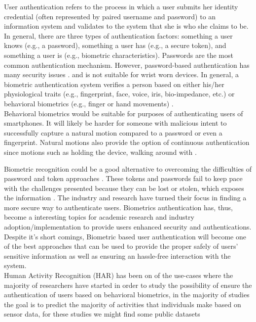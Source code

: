 \documentclass[10pt,halfline,a4paper]{ouparticle}
\begin{document}
\noindent
User authentication refers to the process in which a user submits her identity credential (often represented by paired username and password) to an information system and validates to the system that she is who she claims to be. In general, there are three types of authentication factors: something a user knows (e.g., a password), something a user has (e.g., a secure token), and something a user is (e.g., biometric characteristics). Passwords are the most common authentication mechanism. However, password-based authentication has many security issues \cite{Klein} \cite{Own} \cite{Ratha}. and is not suitable for wrist worn devices. In general, a biometric authentication system verifies a person based on either his/her physiological traits (e.g., fingerprint, face, voice, iris, bio-impedance, etc.) \cite{Own} \cite{Anzaku} \cite{Cornelius} or behavioral biometrics (e.g., finger or hand movements) \cite{Zheng} \cite{Luca}.\\

\noindent
Behavioral biometrics would be suitable for purposes of authenticating users of smartphones. It will likely be harder for someone with malicious intent to successfully capture a natural motion compared to a password or even a fingerprint. Natural motions also provide the option of continuous authentication since motions such as holding the device, walking around with \cite{Maghsoudi}.

\noindent 
Biometric recognition could be a good alternative to overcoming the difficulties of password and token approaches \cite{Alariki}\cite{Crawford}. These tokens and passwords fail to keep pace with the challenges presented because they can be lost or stolen, which exposes the information \cite{Alariki}. The industry and research have turned their focus in finding a more secure way to authenticate users. Biometrics authentication has, thus, become a interesting topics for academic research and industry adoption/implementation to provide users enhanced security and authentications. Despite it's short comings, Biometric based user authentication will become one of the best approaches that can be used to provide the proper safely of users’ sensitive information as well as ensuring an hassle-free interaction with the system.\\


\noindent
Human Activity Recognition (HAR) has been on of the use-cases where the majority of researchers have started in order to study the possibility of ensure the authentication of users based on behavioral biometrics, in the majority of studies the goal is to predict the majority of activities that individuals make based on sensor data, for these studies we might find some public datasets\\
\end{document}
